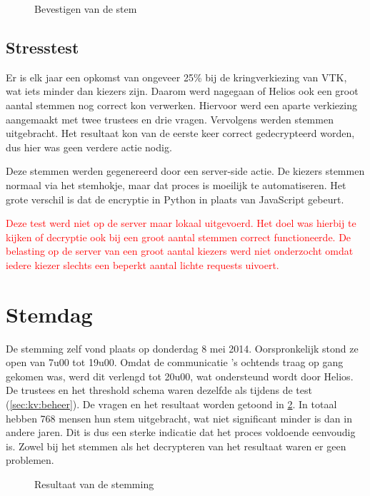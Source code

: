 \begin{figure}
  \caption{Bevestigen van de stem}
  \label{fig:kv:cast_confirm}
\end{figure}

\subsection{Stresstest}

Er is elk jaar een opkomst van ongeveer 25\% bij de kringverkiezing van VTK, wat iets minder dan  kiezers zijn. Daarom werd nagegaan of Helios ook een groot aantal stemmen nog correct kon verwerken. Hiervoor werd een aparte verkiezing aangemaakt met twee trustees en drie vragen. Vervolgens werden  stemmen uitgebracht. Het resultaat kon van de eerste keer correct gedecrypteerd worden, dus hier was geen verdere actie nodig.

\npar Deze stemmen werden gegenereerd door een server-side actie. De kiezers stemmen normaal via het stemhokje, maar dat proces is moeilijk te automatiseren. Het grote verschil is dat de encryptie in Python in plaats van JavaScript gebeurt.


\npar \textcolor{red}{Deze test werd niet op de server maar lokaal uitgevoerd. Het doel was hierbij te kijken of decryptie ook bij een groot aantal stemmen correct functioneerde. De belasting op de server van een groot aantal kiezers werd niet onderzocht omdat iedere kiezer slechts een beperkt aantal lichte requests uivoert.}

\section{Stemdag}
\label{sec:kv:stemdag}

De stemming zelf vond plaats op donderdag 8 mei 2014. Oorspronkelijk stond ze open van 7u00 tot 19u00. Omdat de communicatie 's ochtends traag op gang gekomen was, werd dit verlengd tot 20u00, wat ondersteund wordt door Helios. De trustees en het threshold schema waren dezelfde als tijdens de test (\ref{sec:kv:beheer}). De vragen en het resultaat worden getoond in \ref{fig:kv:result}. In totaal hebben 768 mensen hun stem uitgebracht, wat niet significant minder is dan in andere jaren. Dit is dus een sterke indicatie dat het proces voldoende eenvoudig is. Zowel bij het stemmen als het decrypteren van het resultaat waren er geen problemen.

\begin{figure}
  \caption{Resultaat van de stemming}
  \label{fig:kv:result}
\end{figure}
